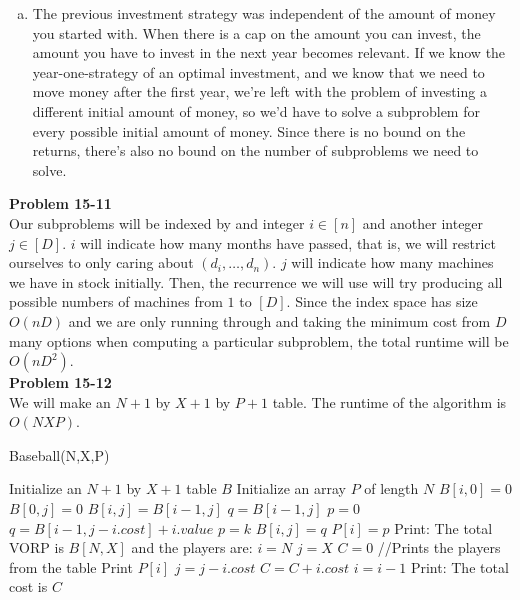 \documentclass{article}
\begin{document}
\begin{enumerate}[a.]
\item The previous investment strategy was independent of the amount of money you started with.  When there is a cap on the amount you can invest, the amount you have to invest in the next year becomes relevant.  If we know the year-one-strategy of an optimal investment, and we know that we need to move money after the first year, we're left with the problem of investing a different initial amount of money, so we'd have to solve a subproblem for every possible initial amount of money.  Since there is no bound on the returns, there's also no bound on the number of subproblems we need to solve.


\end{enumerate}

\noindent\textbf{Problem 15-11}\\

Our subproblems will be indexed by and integer $i\in[n]$ and another integer $j\in[D]$. $i$ will indicate how many months have passed, that is, we will restrict ourselves to only caring about $(d_i, \ldots,d_n)$. $j$ will indicate how many machines we have in stock initially. Then, the recurrence we will use will try producing all possible numbers of machines from $1$ to $[D]$. Since the index space has size $O(nD)$ and we are only running through and taking the minimum cost from $D$ many options when computing a particular subproblem, the total runtime will be $O(nD^2)$.  \\

\noindent\textbf{Problem 15-12}\\

We will make an $N+1$ by $X+1$ by $P+1$ table. The runtime of the algorithm is $O(NXP)$.

\begin{algorithm}
\caption{Baseball(N,X,P)}
\begin{algorithmic}
\State Initialize an  $N+1$ by $X+1$ table $B$
\State Initialize an array $P$ of length $N$
	\State $B[i,0] = 0$
\EndFor
{}
	\State $B[0,j] = 0$
\EndFor
{}
			\State $B[i,j] = B[i-1,j]$
		\EndIf
		\State $q = B[i-1,j]$
		\State $p = 0$
				\State $q = B[i-1,j-i.cost] + i.value$
				\State $p = k$
			\EndIf
		\EndFor
		\State $B[i,j] = q$
		\State $P[i] = p$
	\EndFor
\EndFor
\State Print: The total VORP is $B[N,X]$ and the players are:
\State $i = N$ 
\State $j = X$
\State $C = 0$
 //Prints the players from the table
		\State Print $P[i]$
		\State $j = j - i.cost$
		\State $C = C + i.cost$
	\EndIf
	\State $i = i - 1$
\EndFor
\State Print: The total cost is $C$
\end{algorithmic}
\end{algorithm}
\end{document}
